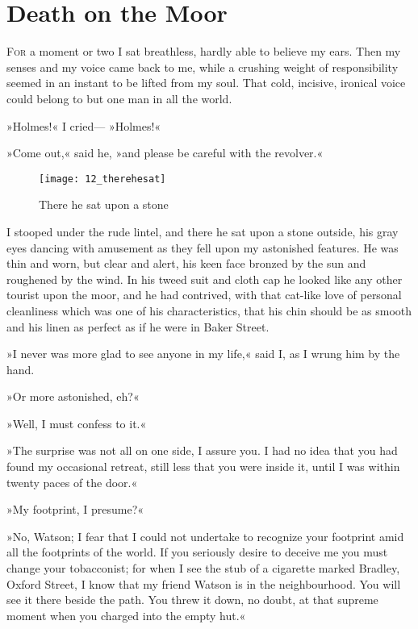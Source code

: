 \chapter{Death on the Moor}
\lettrine[lines=1]{F}{or} a moment or two I sat breathless, hardly able to believe my ears. Then my senses and my voice came back to me, while a crushing weight of responsibility seemed in an instant to be lifted from my soul. That cold, incisive, ironical voice could belong to but one man in all the world.

»Holmes!« I cried— »Holmes!«

»Come out,« said he, »and please be careful with the revolver.«

\begin{figure}[tbph]
\centering
\texttt{[image: 12\_therehesat]}
\caption{There he sat upon a stone}
\end{figure}

I stooped under the rude lintel, and there he sat upon a stone outside, his gray eyes dancing with amusement as they fell upon my astonished features. He was thin and worn, but clear and alert, his keen face bronzed by the sun and roughened by the wind. In his tweed suit and cloth cap he looked like any other tourist upon the moor, and he had contrived, with that cat-like love of personal cleanliness which was one of his characteristics, that his chin should be as smooth and his linen as perfect as if he were in Baker Street.

»I never was more glad to see anyone in my life,« said I, as I wrung him by the hand.

»Or more astonished, eh?«

»Well, I must confess to it.«

»The surprise was not all on one side, I assure you. I had no idea that you had found my occasional retreat, still less that you were inside it, until I was within twenty paces of the door.«

»My footprint, I presume?«

»No, Watson; I fear that I could not undertake to recognize your footprint amid all the footprints of the world. If you seriously desire to deceive me you must change your tobacconist; for when I see the stub of a cigarette marked Bradley, Oxford Street, I know that my friend Watson is in the neighbourhood. You will see it there beside the path. You threw it down, no doubt, at that supreme moment when you charged into the empty hut.«

